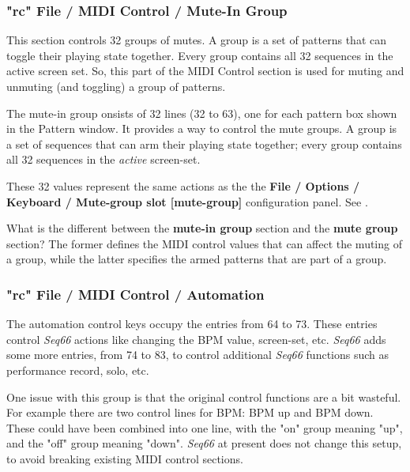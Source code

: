 \subsubsection{"rc" File / MIDI Control / Mute-In Group}
\label{subsubsec:rc_file_midi_ctrl_mutein}

   This section controls 32 groups of mutes.
   A group is a set of patterns that can toggle their playing state
   together.  Every group contains all 32 sequences in the active screen set.
   So, this part of the MIDI Control section is used for muting and unmuting
   (and toggling) a group of patterns.

   The mute-in group onsists of 32 lines (32 to 63), one for each
   pattern box shown in the Pattern window.
   It provides a way to control the mute groups.
   A group is a set of sequences that can arm their playing state
   together; every group contains all 32 sequences in the
   \textsl{active} screen-set.

   These 32 values represent the same actions as the
   the \textbf{File / Options / Keyboard / Mute-group slot [mute-group]} 
   configuration panel.
   See .

   What is the different between the \textbf{mute-in group}
   section and the \textbf{mute group} section?  The former defines the MIDI
   control values that can affect the muting of a group, while the latter
   specifies the armed patterns that are part of a group.

\subsubsection{"rc" File / MIDI Control / Automation}
\label{subsubsec:rc_file_midi_ctrl_automation}

   The automation control keys occupy the entries from 64 to 73.
   These entries control
   \textsl{Seq66} actions like changing the BPM value, screen-set, etc.
   \textsl{Seq66} adds some more entries, from 74 to 83, to control
   additional \textsl{Seq66} functions such as performance
   record, solo, etc.
   
   One issue with this group is that the original control functions are a bit
   wasteful.  For example there are two control lines for BPM:  BPM up and BPM
   down.  These could have been combined into one line, with the "on" group
   meaning "up", and the "off" group meaning "down".  
   \textsl{Seq66} at present does not change this setup, to avoid
   breaking existing MIDI control sections.

